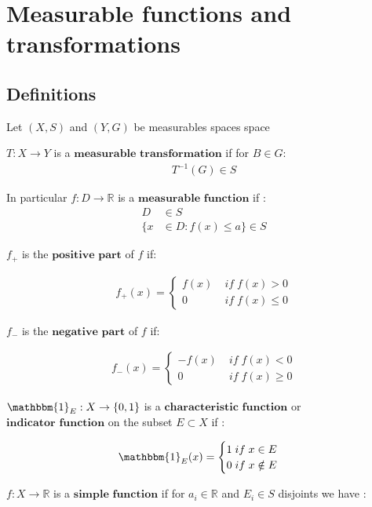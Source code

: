 \section{\LARGE Measurable functions and transformations}

\subsection{Definitions}
Let $(X,S)$ and $(Y,G)$ be measurables spaces space

$T : X \rightarrow Y$ is a $\textbf{measurable transformation}$ if for $B\in G$: 
\begin{align}
T^{-1}(G) \in S
\end{align}

In particular $f:D \rightarrow \mathbb{R}$ is a $\textbf{measurable function}$ if :
\begin{align}
D &\in S\\
\{x &\in D:f(x) \leq a\} \in S 
\end{align}

$f_+$ is the $\textbf{positive part}$ of $f$ if:

\begin{align}
f_+(x) = 
\begin{cases}
f(x) \;&if \;f(x) > 0\\ 
0 \;&if \;f(x) \leq 0
\end{cases}
\end{align}

$f_-$ is the $\textbf{negative part}$ of $f$ if:

\begin{align}
f_-(x) = 
\begin{cases}
-f(x) \;&if \;f(x) < 0\\ 
0 \;&if \;f(x) \geq 0
\end{cases}
\end{align}



$\mathbbm{1}_E : X \rightarrow \{0,1\}$ is a $\textbf{characteristic function}$ or $\textbf{indicator function}$ on the subset $E \subset X$ if :

\begin{align}
\mathbbm{1}_E(x) = 
\begin{cases}
1 \;if \;x \in E\\ 
0 \;if \;x \notin E
\end{cases}
\end{align}

$f : X \rightarrow \mathbb{R}$ is a $\textbf{simple function}$ if for $a_i \in \mathbb{R}$ and $E_i \in S$ disjoints we have :

